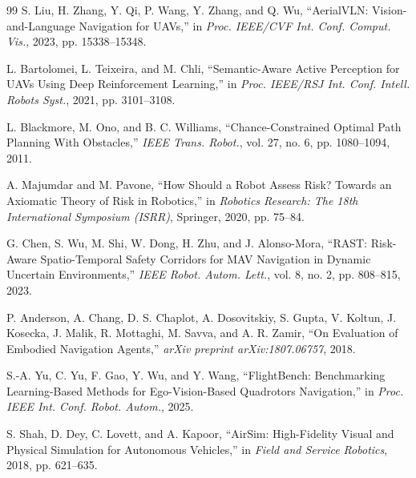 \documentclass[letterpaper,10pt,conference]{ieeeconf}
\begin{document}
{\begin{thebibliography}{99}
S. Liu, H. Zhang, Y. Qi, P. Wang, Y. Zhang, and Q. Wu,
``AerialVLN: Vision-and-Language Navigation for UAVs,'' in \emph{Proc.
IEEE/CVF Int. Conf. Comput. Vis.}, 2023, pp. 15338--15348.

L. Bartolomei, L. Teixeira, and M. Chli,
``Semantic-Aware Active Perception for UAVs Using Deep Reinforcement
Learning,'' in \emph{Proc. IEEE/RSJ Int. Conf. Intell. Robots Syst.}, 2021,
pp. 3101--3108.

L. Blackmore, M. Ono, and B. C. Williams,
``Chance-Constrained Optimal Path Planning With Obstacles,'' \emph{IEEE
Trans. Robot.}, vol. 27, no. 6, pp. 1080--1094, 2011.

A. Majumdar and M. Pavone,
``How Should a Robot Assess Risk? Towards an Axiomatic Theory of Risk in
Robotics,'' in \emph{Robotics Research: The 18th International Symposium
(ISRR)}, Springer, 2020, pp. 75--84.

G. Chen, S. Wu, M. Shi, W. Dong, H. Zhu, and J. Alonso-Mora,
``RAST: Risk-Aware Spatio-Temporal Safety Corridors for MAV Navigation in
Dynamic Uncertain Environments,'' \emph{IEEE Robot. Autom. Lett.}, vol. 8,
no. 2, pp. 808--815, 2023.

P. Anderson, A. Chang, D. S. Chaplot, A. Dosovitskiy, S. Gupta, V. Koltun,
J. Kosecka, J. Malik, R. Mottaghi, M. Savva, and A. R. Zamir,
``On Evaluation of Embodied Navigation Agents,'' \emph{arXiv preprint
arXiv:1807.06757}, 2018.

S.-A. Yu, C. Yu, F. Gao, Y. Wu, and Y. Wang,
``FlightBench: Benchmarking Learning-Based Methods for Ego-Vision-Based
Quadrotors Navigation,'' in \emph{Proc. IEEE Int. Conf. Robot. Autom.},
2025.

S. Shah, D. Dey, C. Lovett, and A. Kapoor,
``AirSim: High-Fidelity Visual and Physical Simulation for Autonomous
Vehicles,'' in \emph{Field and Service Robotics}, 2018, pp. 621--635.

\end{thebibliography}
}
\end{document}
